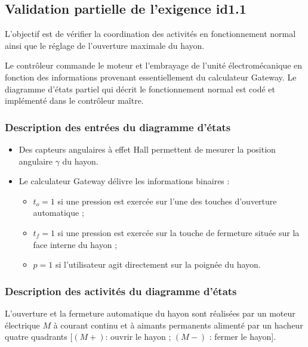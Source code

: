 \documentclass[10pt,fleqn]{article} %
\begin{document}
\begin{multicols}{2}
\begin{multicols}{2}
\subsection*{Validation partielle de l’exigence id1.1}
\begin{obj}
L’objectif est de vérifier la coordination des activités en fonctionnement normal ainsi que le réglage de l’ouverture maximale du hayon.
\end{obj}

Le contrôleur commande le moteur et l’embrayage de l’unité électromécanique en fonction des informations provenant essentiellement du calculateur Gateway. Le diagramme d’états partiel qui décrit le fonctionnement normal est codé et implémenté dans le contrôleur maître. 

\subsubsection*{Description des entrées du diagramme d’états}

\begin{itemize} 
\item Des capteurs angulaires à effet Hall permettent de mesurer la position angulaire $\gamma$ du hayon.
\item Le calculateur Gateway délivre les informations binaires :
\begin{itemize}
\item $t_o=1$ si une pression est exercée sur l’une des touches d’ouverture automatique ;
\item $t_f=1$ si une pression est exercée sur la touche de fermeture située sur la face interne du hayon ;
\item $p=1$ si l’utilisateur agit directement sur la poignée du hayon.
\end{itemize}
\end{itemize}

\subsubsection*{Description des activités du diagramme d’états}
L’ouverture et la fermeture automatique du hayon sont réalisées par un moteur électrique $M$ à courant continu et à aimants permanents alimenté par un hacheur quatre quadrants [$(M+)$: ouvrir le hayon ; $(M-)$  : fermer le hayon].


\end{multicols}
\end{multicols}
\end{document}
